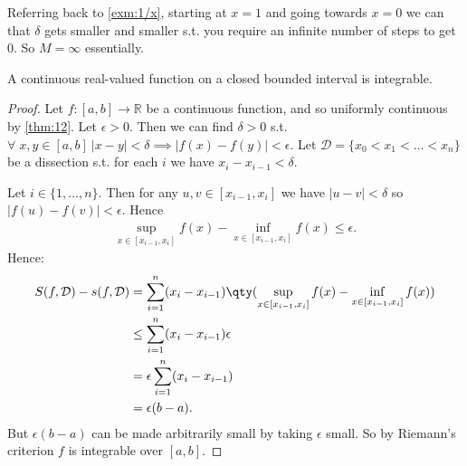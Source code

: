 \begin{remark}
    Referring back to \cref{exm:1/x}, starting at $x = 1$ and going towards $x  = 0$ we can that $\delta$ gets smaller and smaller s.t. you require an infinite number of steps to get $0$.
    So $M = \infty$ essentially.
\end{remark} 

\begin{corollary} \label{cor:14}
    A continuous real-valued function on a closed bounded interval is integrable.
\end{corollary} 

\begin{proof}
    Let $f:[a, b] \to \mathbb{R}$ be a continuous function, and so uniformly continuous by \cref{thm:12}.
    Let $\epsilon > 0$.
    Then we can find $\delta > 0$ s.t. $\forall \; x, y \in [a, b] \ |x - y| < \delta \implies |f(x) - f(y)| < \epsilon$.
    Let $\mathcal{D} = \{ x_0 < x_1 < \dots < x_n\}$ be a dissection s.t. for each $i$ we have $x_i - x_{i-1} < \delta$.

    Let $i \in \{1, \dots, n\}$.
    Then for any $u, v \in [x_{i-1}, x_i]$ we have $|u - v| < \delta$ so $|f(u) - f(v)| < \epsilon$.
    Hence 
    \begin{align*}
        \sup_{x \in [x_{i-1}, x_i]} f(x) - \inf_{x \in [x_{i-1}, x_i]} f(x) \leq \epsilon.
    \end{align*} 
    Hence:
    \begin{align*}
        S(f, \mathcal{D}) - s(f, \mathcal{D}) &= \sum_{i=1}^{n} (x_i - x_{i-1}) \qty(\sup_{x \in [x_{i-1}, x_i]} f(x) - \inf_{x \in [x_{i-1}, x_i]} f(x)) \\
        &\leq \sum_{i=1}^{n} (x_i - x_{i - 1}) \epsilon \\
        &= \epsilon \sum_{i=1}^{n} (x_i - x_{i - 1}) \\
        &= \epsilon (b - a).
    \end{align*} 
    But $\epsilon(b-a)$ can be made arbitrarily small by taking $\epsilon$ small.
    So by Riemann's criterion $f$ is integrable over $[a, b]$.
\end{proof} 